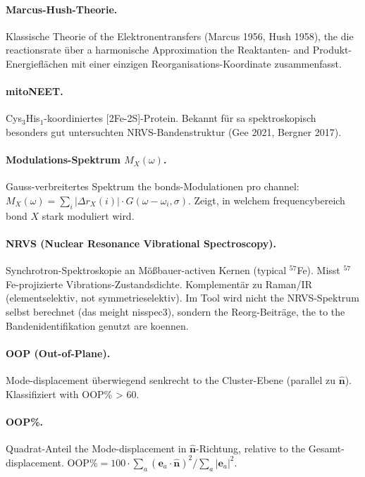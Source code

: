 \documentclass[11pt,a4paper,twoside]{article}
\theoremstyle{remark}
\begin{document}
\paragraph{Marcus-Hush-Theorie.}
Klassische Theorie of the Elektronentransfers (Marcus 1956,
Hush 1958), the die reactionsrate \"uber a harmonische
Approximation the Reaktanten- and Produkt-Energiefl\"achen mit
einer einzigen Reorganisations-Koordinate zusammenfasst.

\paragraph{mitoNEET.}
Cys$_3$His$_1$-koordiniertes [2Fe-2S]-Protein. Bekannt f\"ur
sa spektroskopisch besonders gut untersuchten NRVS-Bandenstruktur
(Gee 2021, Bergner 2017).

\paragraph{Modulations-Spektrum $M_X(\omega)$.}
Gauss-verbreitertes Spektrum the bonds-Modulationen pro channel:
$M_X(\omega) = \sum_i |\Delta r_X(i)| \cdot G(\omega - \omega_i,
\sigma)$. Zeigt, in welchem frequencybereich bond $X$ stark
moduliert wird.

\paragraph{NRVS (Nuclear Resonance Vibrational Spectroscopy).}
Synchrotron-Spektroskopie an M\"o{\ss}bauer-activen Kernen
(typical $^{57}$Fe). Misst $^{57}$Fe-projizierte
Vibrations-Zustandsdichte. Komplement\"ar zu Raman/IR
(elementselektiv, not symmetrieselektiv). Im Tool wird
nicht the NRVS-Spektrum selbst berechnet (das meight nisspec3),
sondern the Reorg-Beitr\"age, the to the Bandenidentifikation
genutzt are koennen.

\paragraph{OOP (Out-of-Plane).}
Mode-displacement \"uberwiegend senkrecht to the Cluster-Ebene
(parallel zu $\hat{\mathbf{n}}$). Klassifiziert with OOP\% > 60.

\paragraph{OOP\%.}
Quadrat-Anteil the Mode-displacement in $\hat{\mathbf{n}}$-Richtung,
relative to the Gesamt-displacement. $\text{OOP\%} = 100 \cdot \sum_a
(\mathbf{e}_a \cdot \hat{\mathbf{n}})^2 / \sum_a |\mathbf{e}_a|^2$.
\end{document}

